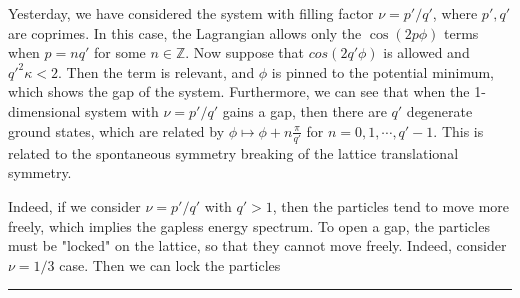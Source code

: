 Yesterday, we have considered the system with filling factor $\nu=p'/q'$, where $p',q'$ are coprimes. In this case, the Lagrangian allows only the $\cos(2p\phi)$ terms when $p=nq'$ for some $n\in \mathbb{Z}$. Now suppose that $cos(2q'\phi)$ is allowed and $q'^2\kappa<2$. Then the term is relevant, and $\phi$ is pinned to the potential minimum, which shows the gap of the system. Furthermore, we can see that when the 1-dimensional system with $\nu=p'/q'$ gains a gap, then there are $q'$ degenerate ground states, which are related by $\phi\mapsto \phi+n\frac{\pi}{q'}$ for $n=0,1,\cdots,q'-1$. This is related to the spontaneous symmetry breaking of the lattice translational symmetry.

Indeed, if we consider $\nu=p'/q'$ with $q'>1$, then the particles tend to move more freely, which implies the gapless energy spectrum. To open a gap, the particles must be "locked" on the lattice, so that they cannot move freely. Indeed, consider $\nu=1/3$ case. Then we can lock the particles 
\noindent\rule{\textwidth}{1pt}
\newline